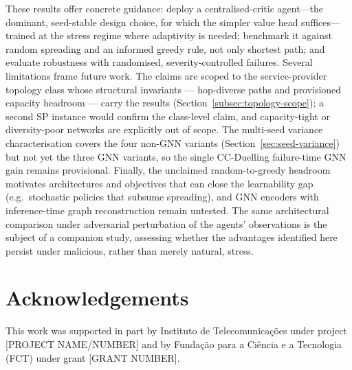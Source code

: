 \documentclass[10pt,journal,comsoc]{IEEEtran}
\begin{document}
These results offer concrete guidance: deploy a centralised-critic agent---the dominant, seed-stable design choice, for which the simpler value head suffices---trained at the stress regime where adaptivity is needed; benchmark it against random spreading and an informed greedy rule, not only shortest path; and evaluate robustness with randomised, severity-controlled failures. Several limitations frame future work. The claims are scoped to the service-provider topology class whose structural invariants --- hop-diverse paths and provisioned capacity headroom --- carry the results (Section~\ref{subsec:topology-scope}); a second SP instance would confirm the class-level claim, and capacity-tight or diversity-poor networks are explicitly out of scope. The multi-seed variance characterisation covers the four non-GNN variants (Section~\ref{sec:seed-variance}) but not yet the three GNN variants, so the single CC-Duelling failure-time GNN gain remains provisional. Finally, the unclaimed random-to-greedy headroom motivates architectures and objectives that can close the learnability gap (e.g.\ stochastic policies that subsume spreading), and GNN encoders with inference-time graph reconstruction remain untested. The same architectural comparison under adversarial perturbation of the agents' observations is the subject of a companion study, assessing whether the advantages identified here persist under malicious, rather than merely natural, stress.

\section*{Acknowledgements}
This work was supported in part by Instituto de Telecomunica\c{c}\~{o}es under project [PROJECT NAME/NUMBER] and by Funda\c{c}\~{a}o para a Ci\^{e}ncia e a Tecnologia (FCT) under grant [GRANT NUMBER].


\begingroup
\sloppy
\setlength{\emergencystretch}{1em}

\endgroup
\end{document}
